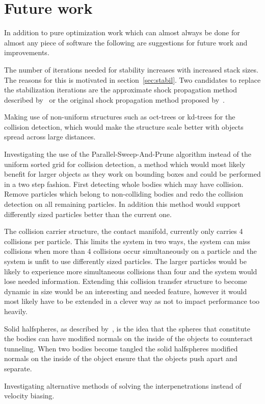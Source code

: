 \section{Future work}
In addition to pure optimization work which can almost always be done for almost any piece
of software the following are suggestions for future work and improvements.

The number of iterations needed for stability increases with increased stack sizes.
The reasons for this is motivated in section~\ref{sec:stabil}.
Two candidates to replace the stabilization iterations are
the approximate shock propagation method described by~\cite{flex} or the original
shock propagation method proposed by~\cite{guendelman}.

Making use of non-uniform structures such as oct-trees or kd-trees for the collision
detection, which would make the structure scale better with objects spread across
large distances.

Investigating the use of the Parallel-Sweep-And-Prune algorithm instead of the
uniform sorted grid for collision detection, a method which would most likely
benefit for larger objects as they work on bounding boxes and could be performed
in a two step fashion. First detecting whole bodies which may have collision.
Remove particles which belong to non-colliding bodies and redo the collision detection
on all remaining particles. In addition this method would support differently sized
particles better than the current one.

The collision carrier structure, the contact manifold, currently only carries
4 collisions per particle. This limits the system in two ways, the system can miss
collisions when more than 4 collisions occur simultaneously on a particle and the
system is unfit to use differently sized particles. The larger particles would
be likely to experience more simultaneous collisions than four and the system would
lose needed information. Extending this collision transfer structure to become dynamic
in size would be an interesting and needed feature, however it would most likely have
to be extended in a clever way as not to impact performance too heavily.

Solid halfspheres, as described by~\cite{flex}, is the idea that the spheres that
constitute the bodies can have modified normals on the inside of the objects to counteract
tunneling. When two bodies become tangled the solid halfspheres modified normals
on the inside of the object ensure that the objects push apart and separate.

Investigating alternative methods of solving the interpenetrations instead of velocity biasing.
